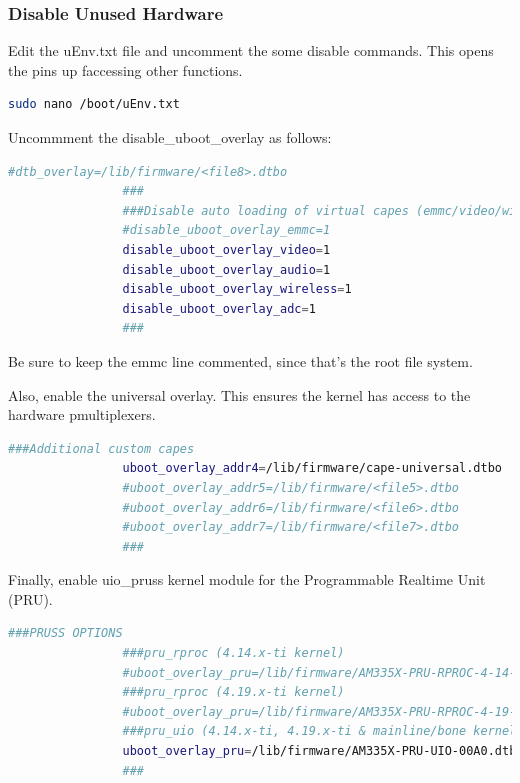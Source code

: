        \subsubsection{Disable Unused Hardware}
            Edit the uEnv.txt file and uncomment the some disable commands. This opens the pins up faccessing   other functions.
            \begin{lstlisting}[language=bash, autogobble=true]
                sudo nano /boot/uEnv.txt
            \end{lstlisting}
            Uncommment the disable\_uboot\_overlay as follows:
            \begin{lstlisting}[language=bash, autogobble=true]
                #dtb_overlay=/lib/firmware/<file8>.dtbo
                ###
                ###Disable auto loading of virtual capes (emmc/video/wireless/adc)
                #disable_uboot_overlay_emmc=1
                disable_uboot_overlay_video=1
                disable_uboot_overlay_audio=1
                disable_uboot_overlay_wireless=1
                disable_uboot_overlay_adc=1
                ###
            \end{lstlisting}
            Be sure to keep the emmc line commented, since that's the root file system.
    
            Also, enable the universal overlay. This ensures the kernel has access to the hardware  pmultiplexers. 
    
            \begin{lstlisting}[language=bash, autogobble=true]
                ###Additional custom capes
                uboot_overlay_addr4=/lib/firmware/cape-universal.dtbo
                #uboot_overlay_addr5=/lib/firmware/<file5>.dtbo
                #uboot_overlay_addr6=/lib/firmware/<file6>.dtbo
                #uboot_overlay_addr7=/lib/firmware/<file7>.dtbo
                ###
            \end{lstlisting}
    
            Finally, enable uio\_pruss kernel module for the Programmable Realtime Unit (PRU).
            \begin{lstlisting}[language=bash, autogobble=true]
                ###PRUSS OPTIONS
                ###pru_rproc (4.14.x-ti kernel)
                #uboot_overlay_pru=/lib/firmware/AM335X-PRU-RPROC-4-14-TI-00A0.dtbo
                ###pru_rproc (4.19.x-ti kernel)
                #uboot_overlay_pru=/lib/firmware/AM335X-PRU-RPROC-4-19-TI-00A0.dtbo
                ###pru_uio (4.14.x-ti, 4.19.x-ti & mainline/bone kernel)
                uboot_overlay_pru=/lib/firmware/AM335X-PRU-UIO-00A0.dtbo
                ###
            \end{lstlisting}
    
